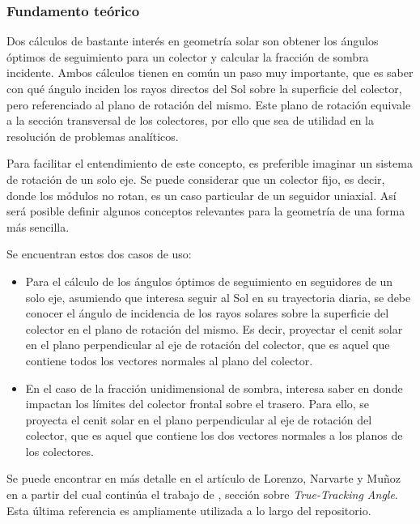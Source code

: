 \subsubsection{Fundamento teórico}

Dos cálculos de bastante interés en geometría solar son obtener los ángulos óptimos de seguimiento para un colector y calcular la fracción de sombra incidente. Ambos cálculos tienen en común un paso muy importante, que es saber con qué ángulo inciden los rayos directos del Sol sobre la superficie del colector, pero referenciado al plano de rotación del mismo. Este plano de rotación equivale a la sección transversal de los colectores, por ello que sea de utilidad en la resolución de problemas analíticos.

Para facilitar el entendimiento de este concepto, es preferible imaginar un sistema de rotación de un solo eje. Se puede considerar que un colector fijo, es decir, donde los módulos no rotan, es un caso particular de un seguidor uniaxial. Así será posible definir algunos conceptos relevantes para la geometría de una forma más sencilla.

Se encuentran estos dos casos de uso:

\begin{itemize}
    \item Para el cálculo de los ángulos óptimos de seguimiento en seguidores de un solo eje, asumiendo que interesa seguir al Sol en su trayectoria diaria, se debe conocer el ángulo de incidencia de los rayos solares sobre la superficie del colector en el plano de rotación del mismo. Es decir, proyectar el cenit solar en el plano perpendicular al eje de rotación del colector, que es aquel que contiene todos los vectores normales al plano del colector.
    \item En el caso de la fracción unidimensional de sombra, interesa saber en donde impactan los límites del colector frontal sobre el trasero. Para ello, se proyecta el cenit solar en el plano perpendicular al eje de rotación del colector, que es aquel que contiene los dos vectores normales a los planos de los colectores.
\end{itemize}

Se puede encontrar en más detalle en el artículo de Lorenzo, Narvarte y Muñoz en \cite{Lorenzo_Narvarte_Muñoz_2011} a partir del cual continúa el trabajo de \cite{Anderson_Mikofski_2020}, sección sobre \textit{True-Tracking Angle}. Esta última referencia es ampliamente utilizada a lo largo del repositorio.

